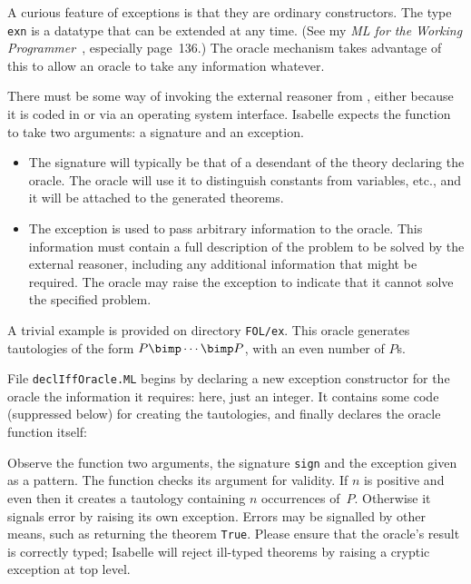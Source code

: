 A curious feature of {\ML} exceptions is that they are ordinary constructors.
The {\ML} type {\tt exn} is a datatype that can be extended at any time.  (See
my {\em {ML} for the Working Programmer}~\cite{paulson-ml2}, especially
page~136.)  The oracle mechanism takes advantage of this to allow an oracle to
take any information whatever.

There must be some way of invoking the external reasoner from \ML, either
because it is coded in {\ML} or via an operating system interface.  Isabelle
expects the {\ML} function to take two arguments: a signature and an
exception.
\begin{itemize}
\item The signature will typically be that of a desendant of the theory
  declaring the oracle.  The oracle will use it to distinguish constants from
  variables, etc., and it will be attached to the generated theorems.

\item The exception is used to pass arbitrary information to the oracle.  This
  information must contain a full description of the problem to be solved by
  the external reasoner, including any additional information that might be
  required.  The oracle may raise the exception to indicate that it cannot
  solve the specified problem.
\end{itemize}

A trivial example is provided on directory {\tt FOL/ex}.  This oracle
generates tautologies of the form $P\bimp\cdots\bimp P$, with an even number
of $P$s. 

File {\tt declIffOracle.ML} begins by declaring a new exception constructor
for the oracle the information it requires: here, just an integer.  It
contains some code (suppressed below) for creating the tautologies, and
finally declares the oracle function itself:
Observe the function two arguments, the signature {\tt sign} and the exception
given as a pattern.  The function checks its argument for validity.  If $n$ is
positive and even then it creates a tautology containing $n$ occurrences
of~$P$.  Otherwise it signals error by raising its own exception.  Errors may
be signalled by other means, such as returning the theorem {\tt True}.
Please ensure that the oracle's result is correctly typed; Isabelle will
reject ill-typed theorems by raising a cryptic exception at top level.

